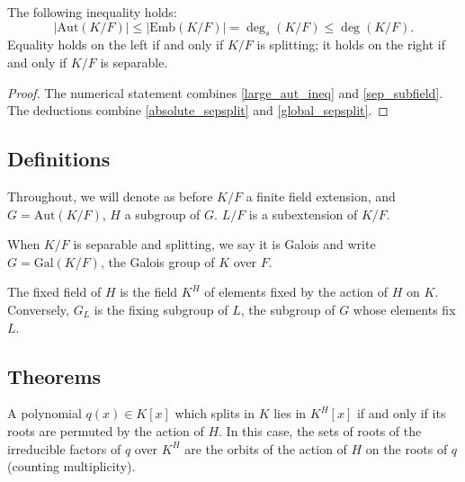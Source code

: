 \begin{theorem} The following inequality holds:
\begin{equation*}
|\text{Aut}(K/F)| \leq |\text{Emb}(K/F)| = \deg_s(K/F) \leq \deg(K/F).
\end{equation*}
Equality holds on the left if and only if $K/F$ is splitting; it holds on the
right if and only if $K/F$ is separable.
\label{galois_size}
\end{theorem}

\begin{proof} The numerical statement combines \ref{large_aut_ineq} and
\ref{sep_subfield}. The deductions combine \ref{absolute_sepsplit} and
\ref{global_sepsplit}. \end{proof}

\subsection{Definitions}

Throughout, we will denote as before $K/F$ a finite field extension, and $G =
\text{Aut}(K/F)$, $H$ a subgroup of $G$. $L/F$ is a subextension of $K/F$.

\begin{definition} When $K/F$ is separable and splitting, we say it is Galois
and
write $G = \text{Gal}(K/F)$, the Galois group of $K$ over $F$.
\label{defn:galois_extension}
\end{definition}

\begin{definition} The fixed field of $H$ is the field $K^H$ of elements fixed
by
the action of $H$ on $K$. Conversely, $G_L$ is the fixing subgroup of $L$,
the subgroup of $G$ whose elements fix $L$.
\label{defn:fixing}
\end{definition}

\subsection{Theorems}

\begin{lemma} A polynomial $q(x) \in K[x]$ which splits in $K$ lies in
$K^H[x]$ if and only if its roots are permuted by the action of $H$. In this
case, the sets of roots of the irreducible factors of $q$ over $K^H$ are the
orbits
of the action of $H$ on the roots of $q$ (counting multiplicity).
\label{root_action}
\end{lemma}

